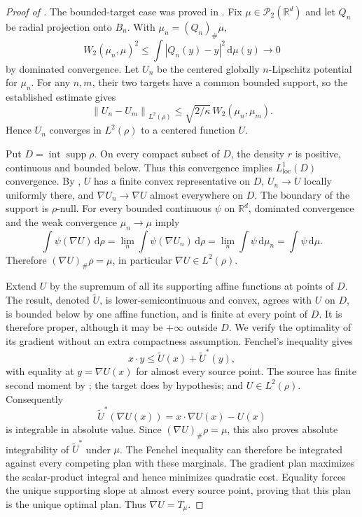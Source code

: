 \documentclass[11pt]{article}
\numberwithin{equation}{section}
\theoremstyle{remark}
\newcommand{\R}{\mathbb R}
\newcommand{\Prob}{\mathcal P}
\newcommand{\supp}{\operatorname{supp}}
\newcommand{\dd}{\,\mathrm d}
\newcommand{\interior}{\operatorname{int}}
\newcommand{\norm}[1]{\left\lVert #1\right\rVert}
\begin{document}
\begin{proof}[Proof of ]
The bounded-target case was proved in . Fix $\mu\in\Prob_2(\R^d)$ and let $Q_n$ be radial projection onto $B_n$. With $\mu_n=(Q_n)_\#\mu$,
\[
 W_2(\mu_n,\mu)^2
 \le\int|Q_n(y)-y|^2\dd\mu(y)\longrightarrow0
\]
by dominated convergence. Let $U_n$ be the centered globally $n$-Lipschitz potential for $\mu_n$. For any $n,m$, their two targets have a common bounded support, so the established estimate gives
\[
 \norm{U_n-U_m}_{L^2(\rho)}
 \le\sqrt{2/\kappa}\,W_2(\mu_n,\mu_m).
\]
Hence $U_n$ converges in $L^2(\rho)$ to a centered function $U$.

Put $D=\interior\supp\rho$. On every compact subset of $D$, the density $r$ is positive, continuous and bounded below. Thus this convergence implies $L^1_{\mathrm{loc}}(D)$ convergence. By , $U$ has a finite convex representative on $D$, $U_n\to U$ locally uniformly there, and $\nabla U_n\to\nabla U$ almost everywhere on $D$. The boundary of the support is $\rho$-null. For every bounded continuous $\psi$ on $\R^d$, dominated convergence and the weak convergence $\mu_n\to\mu$ imply
\[
 \int\psi(\nabla U)\dd\rho
 =\lim_n\int\psi(\nabla U_n)\dd\rho
 =\lim_n\int\psi\dd\mu_n=\int\psi\dd\mu.
\]
Therefore $(\nabla U)_\#\rho=\mu$, in particular $\nabla U\in L^2(\rho)$.

Extend $U$ by the supremum of all its supporting affine functions at points of $D$. The result, denoted $\widetilde U$, is lower-semicontinuous and convex, agrees with $U$ on $D$, is bounded below by one affine function, and is finite at every point of $D$. It is therefore proper, although it may be $+\infty$ outside $D$.
We verify the optimality of its gradient without an extra compactness assumption. Fenchel's inequality gives
\[
 x\cdot y\le\widetilde U(x)+\widetilde U^*(y),
\]
with equality at $y=\nabla U(x)$ for almost every source point. The source has finite second moment by ; the target does by hypothesis; and $U\in L^2(\rho)$. Consequently
\[
 \widetilde U^*(\nabla U(x))=x\cdot\nabla U(x)-U(x)
\]
is integrable in absolute value. Since $(\nabla U)_\#\rho=\mu$, this also proves absolute integrability of $\widetilde U^*$ under $\mu$. The Fenchel inequality can therefore be integrated against every competing plan with these marginals. The gradient plan maximizes the scalar-product integral and hence minimizes quadratic cost. Equality forces the unique supporting slope at almost every source point, proving that this plan is the unique optimal plan. Thus $\nabla U=T_\mu$.


\end{proof}
\end{document}
